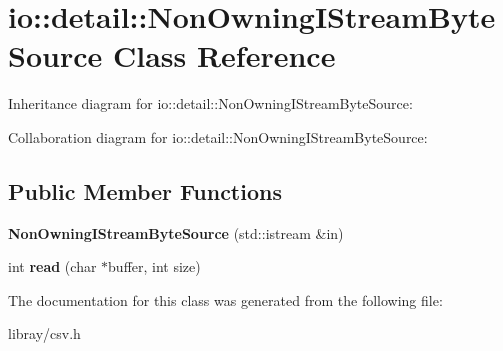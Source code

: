 \hypertarget{classio_1_1detail_1_1NonOwningIStreamByteSource}{}\section{io\+:\+:detail\+:\+:Non\+Owning\+I\+Stream\+Byte\+Source Class Reference}
\label{classio_1_1detail_1_1NonOwningIStreamByteSource}


Inheritance diagram for io\+:\+:detail\+:\+:Non\+Owning\+I\+Stream\+Byte\+Source\+:


Collaboration diagram for io\+:\+:detail\+:\+:Non\+Owning\+I\+Stream\+Byte\+Source\+:
\subsection*{Public Member Functions}
\begin{DoxyCompactItemize}
\item 
\mbox{\label{classio_1_1detail_1_1NonOwningIStreamByteSource_aacb55ba2f52ba1c30810697d6aa92169}} 
{\bfseries Non\+Owning\+I\+Stream\+Byte\+Source} (std\+::istream \&in)
\item 
\mbox{\label{classio_1_1detail_1_1NonOwningIStreamByteSource_ac7b1968c8314896d7ec0ebb97fdda30d}} 
int {\bfseries read} (char $\ast$buffer, int size)
\end{DoxyCompactItemize}


The documentation for this class was generated from the following file\+:\begin{DoxyCompactItemize}
\item 
libray/csv.\+h\end{DoxyCompactItemize}
